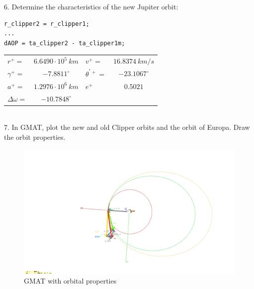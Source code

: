 \documentclass[hidelinks,12pt]{article}
\begin{document}
6. Determine the characteristics of the new Jupiter orbit:\\
\begin{lstlisting}[frame=lines,style=Matlab-editor,basicstyle = \mlttfamily]
r_clipper2 = r_clipper1;
...
dAOP = ta_clipper2 - ta_clipper1m;
\end{lstlisting}
\begin{tabular}{lclc}
$r^+=$&$6.6490 \cdot 10^5~km$&$v^+=$&$16.8374~km/s$\\
$\gamma^+=$&$-7.8811^\circ$&$\theta^{^*+}=$&$-23.1067^\circ$\\
$a^+=$&$1.2976 \cdot 10^6~km$&$e^+$&$0.5021$\\
$\Delta \omega=$&$-10.7848^\circ$
\end{tabular}\\
\vspace{10px}
7. In GMAT, plot the new and old Clipper orbits and the orbit of Europa. Draw the orbit properties.\\
\begin{figure}[!htb]
  \center
  \includegraphics[scale=0.2]{diagram}
  \caption{GMAT with orbital properties}
  \label{fig:Fig1}
\end{figure}
\end{document}
